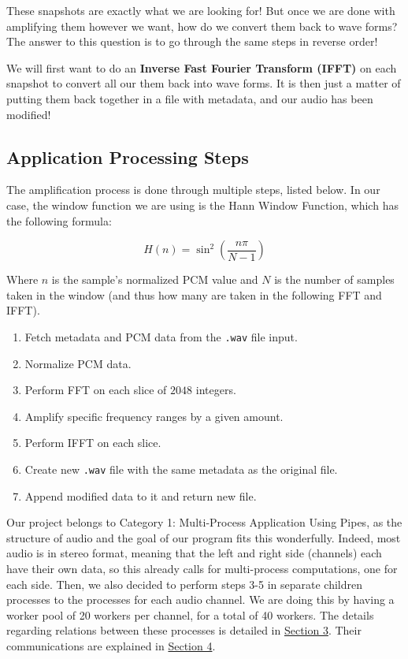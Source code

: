 \documentclass{article}
\begin{document}
These snapshots are exactly what we are looking for! But once we are done with amplifying them however we want, how do we convert them back to wave forms? The answer to this question is to go through the same steps in reverse order!

We will first want to do an \textbf{Inverse Fast Fourier Transform (IFFT)} on each snapshot to convert all our them back into wave forms. It is then just a matter of putting them back together in a file with metadata, and our audio has been modified!

\subsection{Application Processing Steps}\label{steps}

The amplification process is done through multiple steps, listed below. In our case, the window function we are using is the Hann Window Function, which has the following formula:

$$H(n) = \sin^2\left(\frac{n\pi}{N-1}\right)$$

Where $n$ is the sample's normalized PCM value and $N$ is the number of samples taken in the window (and thus how many are taken in the following FFT and IFFT).

\begin{enumerate}
    \item Fetch metadata and PCM data from the \texttt{.wav} file input.
    \item Normalize PCM data.
    \item Perform FFT on each slice of $2048$ integers.
    \item Amplify specific frequency ranges by a given amount.
    \item Perform IFFT on each slice.
    \item Create new \texttt{.wav} file with the same metadata as the original file.
    \item Append modified data to it and return new file.
\end{enumerate}

Our project belongs to Category 1: Multi-Process Application Using Pipes, as the structure of audio and the goal of our program fits this wonderfully. Indeed, most audio is in stereo format, meaning that the left and right side (channels) each have their own data, so this already calls for multi-process computations, one for each side. Then, we also decided to perform steps 3-5 in separate children processes to the processes for each audio channel. We are doing this by having a worker pool of 20 workers per channel, for a total of 40 workers. The details regarding relations between these processes is detailed in \hyperref[arch]{Section 3}. Their communications are explained in \hyperref[comm]{Section 4}.
\end{document}
